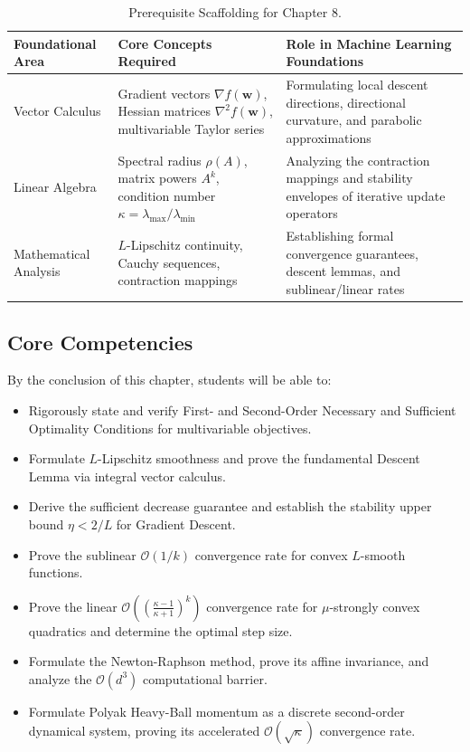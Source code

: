 \begin{table}[htbp]
\centering
\small
\begin{tabularx}{\textwidth}{lXX}
\toprule
\textbf{Foundational Area} & \textbf{Core Concepts Required} & \textbf{Role in Machine Learning Foundations} \\
\midrule
Vector Calculus & Gradient vectors $\nabla f(\mathbf{w})$, Hessian matrices $\nabla^2 f(\mathbf{w})$, multivariable Taylor series & Formulating local descent directions, directional curvature, and parabolic approximations \\
\addlinespace
Linear Algebra & Spectral radius $\rho(A)$, matrix powers $A^k$, condition number $\kappa = \lambda_{\max}/\lambda_{\min}$ & Analyzing the contraction mappings and stability envelopes of iterative update operators \\
\addlinespace
Mathematical Analysis & $L$-Lipschitz continuity, Cauchy sequences, contraction mappings & Establishing formal convergence guarantees, descent lemmas, and sublinear/linear rates \\
\bottomrule
\end{tabularx}
\caption{Prerequisite Scaffolding for Chapter 8.}
\label{tab:w08_prereqs}
\end{table}

\subsection{Core Competencies}
By the conclusion of this chapter, students will be able to:
\begin{itemize}
    \item Rigorously state and verify First- and Second-Order Necessary and Sufficient Optimality Conditions for multivariable objectives.
    \item Formulate $L$-Lipschitz smoothness and prove the fundamental Descent Lemma via integral vector calculus.
    \item Derive the sufficient decrease guarantee and establish the stability upper bound $\eta < 2/L$ for Gradient Descent.
    \item Prove the sublinear $\mathcal{O}(1/k)$ convergence rate for convex $L$-smooth functions.
    \item Prove the linear $\mathcal{O}\left(\left(\frac{\kappa - 1}{\kappa + 1}\right)^k\right)$ convergence rate for $\mu$-strongly convex quadratics and determine the optimal step size.
    \item Formulate the Newton-Raphson method, prove its affine invariance, and analyze the $\mathcal{O}(d^3)$ computational barrier.
    \item Formulate Polyak Heavy-Ball momentum as a discrete second-order dynamical system, proving its accelerated $\mathcal{O}(\sqrt{\kappa})$ convergence rate.
\end{itemize}

